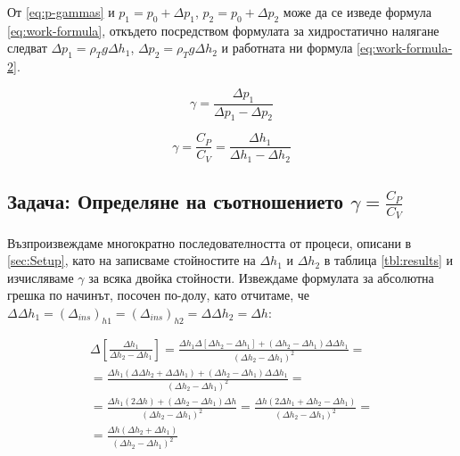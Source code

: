 \documentclass[12pt]{article}
\begin{document}
От \ref{eq:p-gammas} и $p_1 = p_0 + \Delta p_1$, $p_2 = p_0 + \Delta p_2$ може да се изведе формула \ref{eq:work-formula}, откъдето посредством формулата за хидростатично налягане следват $\Delta p_1 = \rho_T g \Delta h_1$, $\Delta p_2 = \rho_T g \Delta h_2$ и работната ни формула \ref{eq:work-formula-2}.
    
\begin{equation}\label{eq:work-formula}
    \gamma = \frac{\Delta p_1}{\Delta p_1 - \Delta p_2}
\end{equation}

\begin{equation}\label{eq:work-formula-2}
    \gamma = \frac{C_P}{C_V} = \frac{\Delta h_1}{\Delta h_1 - \Delta h_2}
\end{equation}

\subsection{Задача: Определяне на съотношението $\gamma = \frac{C_P}{C_V}$}
Възпроизвеждаме многократно последователността от процеси, описани в \ref{sec:Setup}, като на записваме стойностите на $\Delta h_1$ и $\Delta h_2$ в таблица \ref{tbl:results} и изчисляваме $\gamma$ за всяка двойка стойности. Извеждаме формулата за абсолютна грешка по начинът, посочен по-долу, като отчитаме, че $\Delta \Delta h_1 = (\Delta_{ins})_{h1} = (\Delta_{ins})_{h2} = \Delta \Delta h_2 = \Delta h$:

\begin{align*}\label{eq:derivation-abs-err}
    \Delta \left[\frac{\Delta h_1}{\Delta h_2 - \Delta h_1}\right] = 
    \frac{\Delta h_1 \Delta [\Delta h_2 - \Delta h_1] + (\Delta h_2 - \Delta h_1)\Delta\Delta h_1}{(\Delta h_2 - \Delta h_1)^2} = \\ 
    = \frac{\Delta h_1 (\Delta\Delta h_2 + \Delta\Delta h_1) + (\Delta h_2 - \Delta h_1)\Delta\Delta h_1}{(\Delta h_2 - \Delta h_1)^2} = \\
    = \frac{\Delta h_1 (2\Delta h) + (\Delta h_2 - \Delta h_1)\Delta h}{(\Delta h_2 - \Delta h_1)^2} = \frac{\Delta h(2\Delta h_1 + \Delta h_2 - \Delta h_1)}{(\Delta h_2 - \Delta h_1)^2} = \\
    = \frac{\Delta h(\Delta h_2 + \Delta h_1)}{(\Delta h_2 - \Delta h_1)^2}
\end{align*}
\end{document}
